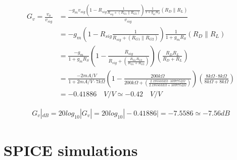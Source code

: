 \documentclass[10pt,a4paper]{book}
\begin{document}
\begin{align}
G_v = \frac{v_o}{v_{sig}} &= \frac{-g_m v_{sig} \left(1 - R_{sig} \frac{1}{R_{sig} + (R_{G1} \parallel R_{G2})}\right) \frac{1}{1+ g_m R_S} (R_D \parallel R_L)}{v_{sig}}\\
&= -g_m \left(1 - R_{sig} \frac{1}{R_{sig} + (R_{G1} \parallel R_{G2})}\right) \frac{1}{1+ g_m R_S} (R_D \parallel R_L)\\
&= \frac{-g_m}{1+ g_m R_S} \left(1 - \frac{R_{sig}}{R_{sig} + \left(\frac{R_{G1}R_{G2}}{R_{G1}+R_{G2}}\right)}\right) \left(\frac{R_{D}R_{L}}{R_{D}+R_{L}}\right)\\
&= \frac{-2mA/V}{1+ 2mA/V \cdot 7k\Omega} \left(1 - \frac{200k\Omega}{200k\Omega + \left(\frac{2.19550M\Omega \cdot 1097752\Omega}{2.19550M\Omega +1097752\Omega}\right)}\right) \left(\frac{8k\Omega \cdot 8k\Omega}{8k\Omega + 8k\Omega}\right)\\
&= -0.41886 \quad V/V \simeq -0.42 \quad V/V
\end{align}

\begin{align}
G_v|_{dB} = 20 log_{10} |G_v| = 20 log_{10} |-0.41886| = -7.5586 \simeq -7.56 dB
\end{align}

\section{SPICE simulations}
\end{document}
